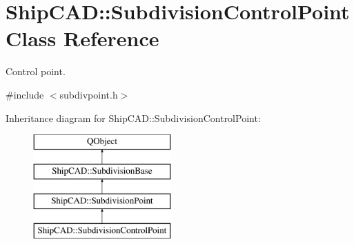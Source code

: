 \hypertarget{classShipCAD_1_1SubdivisionControlPoint}{\section{Ship\-C\-A\-D\-:\-:Subdivision\-Control\-Point Class Reference}
\label{classShipCAD_1_1SubdivisionControlPoint}
}


Control point.  




{\ttfamily \#include $<$subdivpoint.\-h$>$}

Inheritance diagram for Ship\-C\-A\-D\-:\-:Subdivision\-Control\-Point\-:\begin{figure}[H]
\begin{center}
\leavevmode
\includegraphics[height=4.000000cm]{classShipCAD_1_1SubdivisionControlPoint}
\end{center}
\end{figure}
